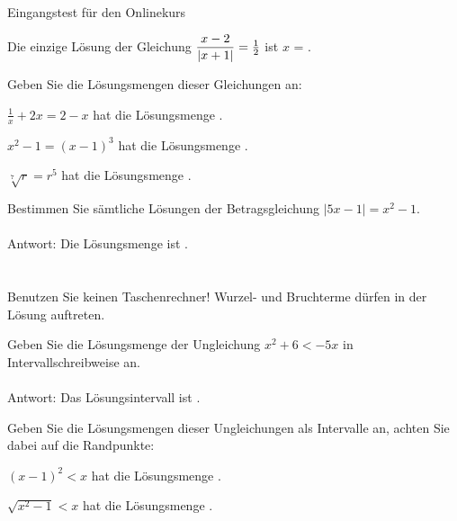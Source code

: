 \begin{MTest}{Eingangstest für den Onlinekurs}
\begin{MExercise}
Die einzige Lösung der Gleichung $\dfrac{x-2}{|x+1|}=\frac12$ ist $x$ = . %
\end{MExercise}

 
\begin{MExercise}
Geben Sie die Lösungsmengen dieser Gleichungen an:
\begin{MExerciseItems}
\item{$\frac1x+2x=2-x$ hat die Lösungsmenge .}
\item{$x^2-1=(x-1)^3$ hat die Lösungsmenge .}
\item{$\sqrt[7]{r}=r^5$ hat die Lösungsmenge .}
\end{MExerciseItems}
\end{MExercise}
 
\begin{MExercise}
Bestimmen Sie sämtliche Lösungen der Betragsgleichung $|5x-1|=x^2-1$.
\ \\ \ \\
Antwort: Die Lösungsmenge ist .\\
\ \\ \ \\
Benutzen Sie keinen Taschenrechner! Wurzel- und Bruchterme dürfen in der Lösung auftreten.
\end{MExercise}

\begin{MExercise}
Geben Sie die Lösungsmenge der Ungleichung $x^2+6< -5x$ in Intervallschreibweise an.\\ \ \\
Antwort: Das Lösungsintervall ist .
\end{MExercise}


\begin{MExercise}
Geben Sie die Lösungsmengen dieser Ungleichungen als Intervalle an, achten Sie dabei auf die Randpunkte:
\begin{MExerciseItems}
\item{$(x-1)^2<x$ hat die Lösungsmenge .}
\item{$\sqrt{x^2-1}<x$ hat die Lösungsmenge \MLIntervalQuestion{40}{[1,infty)}{3}{FINA2}.}
\end{MExerciseItems}
\end{MExercise}


\end{MTest}
